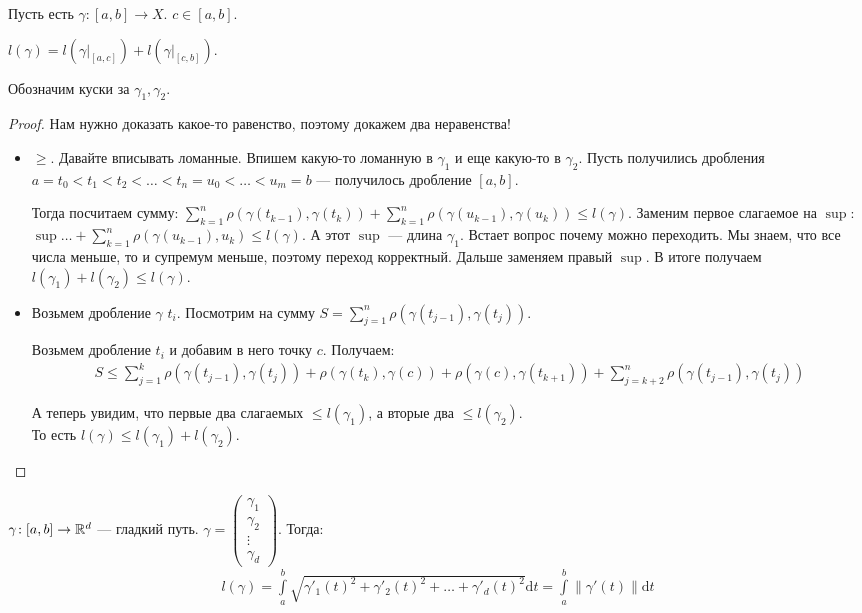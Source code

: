 \begin{theorem}
    Пусть есть $\gamma\!: [a, b] \to X$.  $c \in [a, b]$. 

    $l(\gamma) = l(\gamma \Big|_{[a, c]}) + l(\gamma \Big|_{[c, b]})$.

    Обозначим куски за  $\gamma_1, \gamma_2$.
\end{theorem}
\begin{proof}
    Нам нужно доказать какое-то равенство, поэтому докажем два неравенства!
    \begin{itemize}
        \item $\ge$. Давайте вписывать ломанные. Впишем какую-то ломанную в $\gamma_1$ и еще какую-то в $\gamma_2$. Пусть получились дробления $a = t_0 < t_1 < t_2 < \ldots < t_n = u_0 < \ldots < u_m = b$ --- получилось дробление $[a, b]$.

            Тогда посчитаем сумму:  $\sum\limits_{k=1}^n \rho(\gamma(t_{k-1}), \gamma(t_k)) + \sum\limits_{k=1}^n \rho(\gamma(u_{k-1}), \gamma(u_k)) \le l(\gamma)$. Заменим первое слагаемое на $\sup$: $\sup \ldots + \sum\limits_{k=1}^n \rho(\gamma(u_{k-1}), u_k) \le l(\gamma)$. А этот $\sup$ --- длина  $\gamma_1$. Встает вопрос почему можно переходить. Мы знаем, что все числа меньше, то и супремум меньше, поэтому переход корректный. Дальше заменяем правый $\sup$. В итоге получаем  $l(\gamma_1) + l(\gamma_2) \le l(\gamma)$.
        \item Возьмем дробление $\gamma$  $t_i$. Посмотрим на сумму  $S = \sum\limits_{j=1}^n\rho(\gamma(t_{j-1}), \gamma(t_j))$. 

            Возьмем дробление $t_i$ и добавим в него точку  $c$. Получаем: 
             \begin{align*}
                S \le \sum_{j=1}^k \rho(\gamma(t_{j-1}), \gamma(t_j)) + \rho(\gamma(t_k), \gamma(c)) + \rho(\gamma(c), \gamma(t_{k+1})) + \sum_{j = k + 2}^n \rho(\gamma(t_{j-1}), \gamma(t_j))
            \end{align*}
            
            А теперь увидим, что первые два слагаемых $\le l(\gamma_1)$, а вторые два $\le l(\gamma_2)$.\\
            То есть $l(\gamma) \le l(\gamma_1) + l(\gamma_2)$.
    \end{itemize}
\end{proof}
\begin{theorem}
    $\gamma\!: [a,b] \to \mathbb{R}^d$ --- гладкий путь. $\gamma = \begin{pmatrix} \gamma_1 \\ \gamma_2 \\ \vdots \\ \gamma_d \end{pmatrix}$. Тогда: 
\begin{align*}
    l(\gamma) = \int\limits_a^b\sqrt{\gamma'_1(t)^2+ \gamma'_2(t)^2 + \ldots + \gamma'_d(t)^2}\mathrm{d}t = \int\limits_a^b \| \gamma'(t) \| \mathrm{d}t
\end{align*}
\end{theorem}
